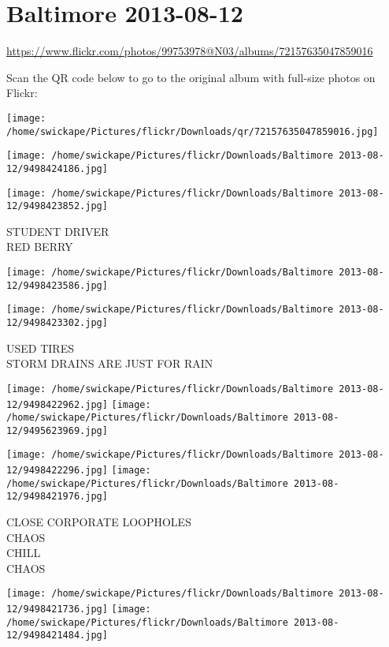 \documentclass[10pt,letterpaper]{article}
\title{}
\author{}
\date{}
\begin{document}
\section*{Baltimore 2013-08-12}

\url{https://www.flickr.com/photos/99753978@N03/albums/72157635047859016}

Scan the QR code below to go to the original album with full-size photos on Flickr:

\texttt{[image: /home/swickape/Pictures/flickr/Downloads/qr/72157635047859016.jpg]}
\pagebreak

\texttt{[image: /home/swickape/Pictures/flickr/Downloads/Baltimore 2013-08-12/9498424186.jpg]}

\vspace{0.25in}
\texttt{[image: /home/swickape/Pictures/flickr/Downloads/Baltimore 2013-08-12/9498423852.jpg]}

STUDENT DRIVER\\
RED BERRY
\pagebreak

\texttt{[image: /home/swickape/Pictures/flickr/Downloads/Baltimore 2013-08-12/9498423586.jpg]}

\vspace{0.25in}
\texttt{[image: /home/swickape/Pictures/flickr/Downloads/Baltimore 2013-08-12/9498423302.jpg]}

USED TIRES\\
STORM DRAINS ARE JUST FOR RAIN
\pagebreak

\texttt{[image: /home/swickape/Pictures/flickr/Downloads/Baltimore 2013-08-12/9498422962.jpg]}
\texttt{[image: /home/swickape/Pictures/flickr/Downloads/Baltimore 2013-08-12/9495623969.jpg]}

\texttt{[image: /home/swickape/Pictures/flickr/Downloads/Baltimore 2013-08-12/9498422296.jpg]}
\texttt{[image: /home/swickape/Pictures/flickr/Downloads/Baltimore 2013-08-12/9498421976.jpg]}

CLOSE CORPORATE LOOPHOLES\\
CHAOS\\
CHILL\\
CHAOS
\pagebreak

\texttt{[image: /home/swickape/Pictures/flickr/Downloads/Baltimore 2013-08-12/9498421736.jpg]}
\texttt{[image: /home/swickape/Pictures/flickr/Downloads/Baltimore 2013-08-12/9498421484.jpg]}
\end{document}
